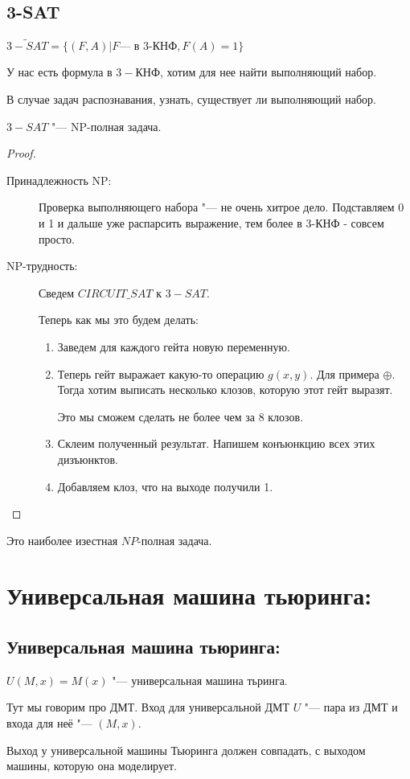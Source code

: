 \subsection{3-SAT}
\begin{Def}
	$\tilde{3-SAT} = \{(F, A)|F \text{--- в 3-КНФ}, F(A) = 1\}$
	
	У нас есть формула в $3-$КНФ, хотим для нее найти выполняющий набор.

	В случае задач распознавания, узнать, существует ли выполняющий набор. 
\end{Def} 
\begin{theorem}
	$3-SAT$ "--- NP-полная задача.
\end{theorem}
\begin{proof}
	\begin{description}
	\item[Принадлежность NP:]
		Проверка выполняющего набора "--- не очень хитрое дело. Подставляем 0 и 1 и 
		дальше уже распарсить выражение, тем более в 3-КНФ - совсем просто. 
	\item[NP-трудность:]
		Сведем $CIRCUIT\_SAT$ к $3-SAT$. 
		
		Теперь как мы это будем делать:
		\begin{enumerate}
		\item Заведем для каждого гейта новую переменную.
		\item Теперь гейт выражает какую-то операцию $g(x, y)$. Для примера $\oplus$. 
		Тогда хотим выписать несколько клозов, которую этот гейт выразят. 

		Это мы сможем сделать не более чем за 8 клозов.
		\item 
		Склеим полученный результат. Напишем конъюнкцию всех этих дизъюнктов. 
		\item 
		Добавляем клоз, что на выходе получили 1. 
		\end{enumerate}
	\end{description}
\end{proof}
\begin{Rem}
	Это наиболее изестная $NP$-полная задача. 
\end{Rem}

\section{Универсальная машина тьюринга:}
\subsection{Универсальная машина тьюринга:}
\begin{Def}
	$U(M, x) = M(x)$ "--- универсальная машина тьринга.
	
	Тут мы говорим про ДМТ.
	Вход для универсальной ДМТ $U$ "--- пара из ДМТ и входа для неё "--- $(M, x)$.
	
	Выход у универсальной машины Тьюринга должен совпадать, с выходом машины, которую она моделирует.
\end{Def}

